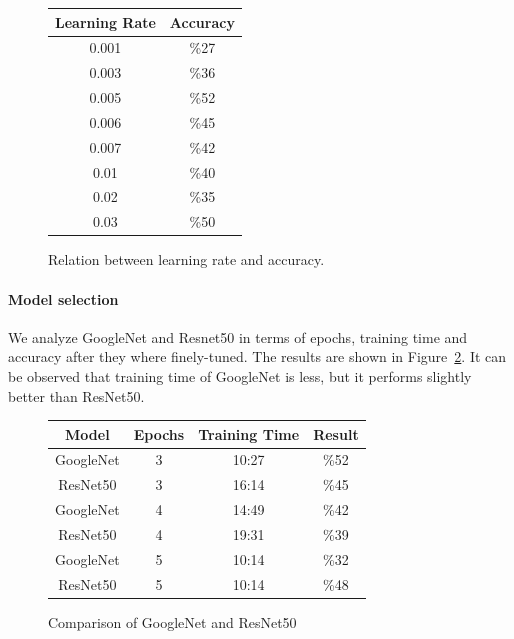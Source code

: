 \documentclass[twocolumn]{article}
\begin{document}
\begin{figure}

\begin{center}
 \begin{tabular}{|c|c|}
 \hline
 Learning Rate&Accuracy\\
 \hline
  \hline 0.001 & \%27 \\
 \hline 0.003 & \%36 \\

 \hline 0.005 & \%52 \\

  \hline 0.006 & \%45 \\
 \hline 0.007 & \%42 \\
  \hline 0.01 & \%40 \\
  \hline 0.02 & \%35 \\

  \hline
 0.03 & \%50 \\

 \hline
 
\end{tabular}
\caption{Relation between learning rate and accuracy.}
\label{learning_rate}
\end{center}
\end{figure}

\paragraph{Model selection}
We analyze GoogleNet and Resnet50 in terms of epochs, training time and accuracy after they where finely-tuned. The results are shown in Figure~\ref{model}. It can be observed that training time of GoogleNet is less, but it performs slightly better than ResNet50. 

\begin{figure}
\begin{center}
 \begin{tabular}{|c|c|c|c|}
 \hline
 Model&Epochs&Training Time&Result\\
 \hline
   GoogleNet&3&10:27&\%52\\
 \hline
 ResNet50&3&16:14&\%45\\
 \hline
   GoogleNet&4&14:49&\%42\\
 \hline
 ResNet50&4&19:31&\%39\\
 \hline  GoogleNet&5&10:14&\%32\\
 \hline
 ResNet50&5&10:14&\%48\\
 \hline
 \hline
 
\end{tabular}
\caption{Comparison of GoogleNet and ResNet50}
\label{model}
\end{center}
\end{figure}
\end{document}
